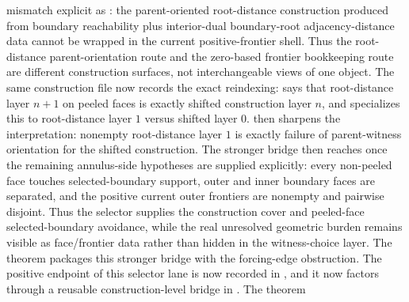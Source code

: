 \documentclass[11pt]{article}
\begin{document}
mismatch explicit as
:
the parent-oriented root-distance construction produced from boundary
reachability plus interior-dual boundary-root adjacency-distance data cannot be
wrapped in the current positive-frontier shell.  Thus the root-distance
parent-orientation route and the zero-based frontier bookkeeping route are
different construction surfaces, not interchangeable views of one object.  The
same construction file now records the exact reindexing:
says that root-distance layer \(n+1\) on peeled faces is exactly shifted
construction layer \(n\), and
specializes this to root-distance layer \(1\) versus shifted layer \(0\).
then sharpens the interpretation: nonempty root-distance layer \(1\) is exactly
failure of parent-witness orientation for the shifted construction.
The stronger bridge
then reaches
 once the
remaining annulus-side hypotheses are supplied explicitly: every non-peeled face
touches selected-boundary support, outer and inner boundary faces are separated,
and the positive current outer frontiers are nonempty and pairwise disjoint.
Thus the selector supplies the construction cover and peeled-face
selected-boundary avoidance, while the real unresolved geometric burden remains
visible as face/frontier data rather than hidden in the witness-choice layer.
The theorem
packages this stronger bridge with the forcing-edge obstruction.
The positive endpoint of this selector lane is now recorded in
, and it now factors
through a reusable construction-level bridge in
.  The theorem
\end{document}
